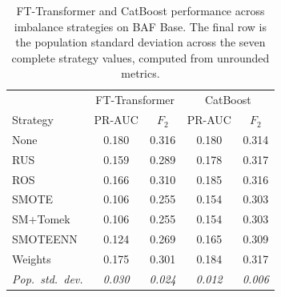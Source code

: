 \begin{table}[H]
\centering
\caption{FT-Transformer and CatBoost performance across imbalance strategies on BAF Base. The final row is the population standard deviation across the seven complete strategy values, computed from unrounded metrics.}
\label{tab:transformer_robustness_baf}
\begin{tabular}{l cc cc}
\toprule
& \multicolumn{2}{c}{FT-Transformer} & \multicolumn{2}{c}{CatBoost} \\
Strategy & PR-AUC & $F_2$ & PR-AUC & $F_2$ \\
\midrule
None      & 0.180 & 0.316 & 0.180 & 0.314 \\
RUS       & 0.159 & 0.289 & 0.178 & 0.317 \\
ROS       & 0.166 & 0.310 & 0.185 & 0.316 \\
SMOTE     & 0.106 & 0.255 & 0.154 & 0.303 \\
SM+Tomek  & 0.106 & 0.255 & 0.154 & 0.303 \\
SMOTEENN  & 0.124 & 0.269 & 0.165 & 0.309 \\
Weights   & 0.175 & 0.301 & 0.184 & 0.317 \\
\midrule
\textit{Pop.\ std.\ dev.} & \textit{0.030} & \textit{0.024} & \textit{0.012} & \textit{0.006} \\
\bottomrule
\end{tabular}
\end{table}